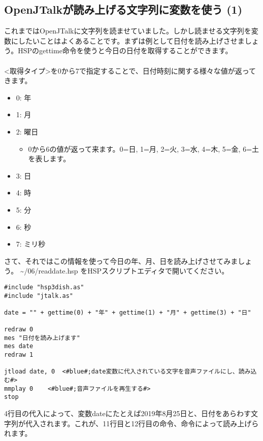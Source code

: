 \subsection{OpenJTalkが読み上げる文字列に変数を使う (1)}
これまではOpenJTalkに文字列を読ませていました。しかし読ませる文字列を変数にしたいことはよくあることです。まずは例として日付を読み上げさせましょう。HSPのgettime命令を使うと今日の日付を取得することができます。\\
\\
<取得タイプ>を0から7で指定することで、日付時刻に関する様々な値が返ってきます。
\begin{itemize}
\item 0: 年
\item 1: 月
\item 2: 曜日
\begin{itemize}
 \item 0から6の値が返って来ます。0=日, 1=月, 2=火, 3=水, 4=木, 5=金, 6=土 を表します。
\end{itemize}
\item 3: 日
\item 4: 時
\item 5: 分
\item 6: 秒
\item 7: ミリ秒
\end{itemize}
さて、それではこの情報を使って今日の年、月、日を読み上げさせてみましょう。 \textasciitilde /06/readdate.hsp をHSPスクリプトエディタで開いてください。\\

\begin{lstlisting}[caption=readdate.hsp,label=readdate.hsp]
#include "hsp3dish.as"
#include "jtalk.as"

date = "" + gettime(0) + "年" + gettime(1) + "月" + gettime(3) + "日"

redraw 0
mes "日付を読み上げます"
mes date
redraw 1

jtload date, 0	<#blue#;date変数に代入されている文字を音声ファイルにし、読み込む#>
mmplay 0	<#blue#;音声ファイルを再生する#>
stop
\end{lstlisting}

4行目の代入によって、変数dateにたとえば2019年8月25日と、日付をあらわす文字列が代入されます。これが、11行目と12行目の命令、命令によって読み上げられます。\\

\begin{tcolorbox}[title=\useOmetoi]
\begin{enumerate}
\end{enumerate}
\end{tcolorbox}
